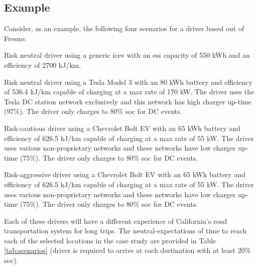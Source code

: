 \documentclass[11pt]{article}
\begin{document}
\begin{multicols}{2}
\subsection*{Example}

Consider, as an example, the following four scenarios for a driver based out of Fresno:


\begin{compactenum}
	\item Risk neutral driver using a generic \gls{icev} with an \gls{ess} capacity of 550 kWh and an efficiency of 2700 kJ/km.
	\item Risk neutral driver using a Tesla Model 3 with an 80 kWh battery and efficiency of 536.4 kJ/km capable of charging at a max rate of 170 kW. The driver uses the Tesla DC station network exclusively and this network has high charger up-time (97\%). The driver only charges to 80\% \gls{soc} for DC events.
	\item Risk-cautious driver using a Chevrolet Bolt EV with an 65 kWh battery and efficiency of 626.5 kJ/km capable of charging at a max rate of 55 kW. The driver uses various non-proprietary networks and these networks have low charger up-time (75\%). The driver only charges to 80\% \gls{soc} for DC events.
	\item Risk-aggressive driver using a Chevrolet Bolt EV with an 65 kWh battery and efficiency of 626.5 kJ/km capable of charging at a max rate of 55 kW. The driver uses various non-proprietary networks and these networks have low charger up-time (75\%). The driver only charges to 80\% \gls{soc} for DC events.
\end{compactenum}

Each of these drivers will have a different experience of California's road transportation system for long trips. The neutral-expectations of time to reach each of the selected locations in the case study are provided in Table \ref{tab:scenarios} (driver is required to arrive at each destination with  at least 20\% \gls{soc}).


\end{multicols}
\end{document}
